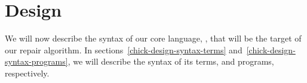 \section{Design}

We will now describe the syntax of our core language, \Chick{}, that will be the
target of our repair algorithm.  In sections~\ref{chick-design-syntax-terms}
and~\ref{chick-design-syntax-programs}, we will describe the syntax of its
terms, and programs, respectively.








